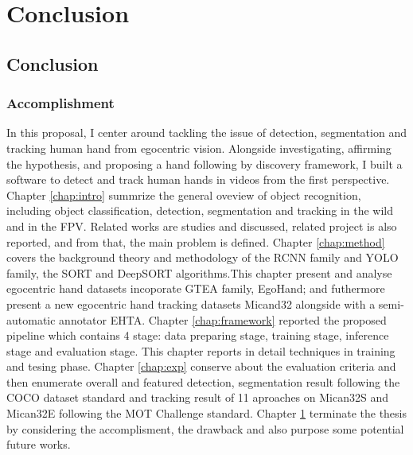 \chapter{Conclusion}\label{chap:conclusion}
\section{Conclusion}
\subsection{Accomplishment}
In this proposal, I center around tackling the issue of detection, segmentation and tracking human hand from egocentric vision. Alongside investigating, affirming the hypothesis, and proposing a hand following by discovery framework, I built a software to detect and track human hands in videos from the first perspective. Chapter \ref{chap:intro} summrize the general oveview of object recognition, including object classification, detection, segmentation and tracking in the wild and in the FPV. Related works are studies and discussed, related project is also reported, and from that, the main problem is defined. Chapter \ref{chap:method} covers the background theory and methodology of the RCNN family and YOLO family, the SORT and DeepSORT algorithms.This chapter present and analyse egocentric  hand datasets incoporate GTEA family, EgoHand; and futhermore present a new egocentric hand tracking datasets Micand32 alongside with a semi-automatic annotator EHTA. Chapter \ref{chap:framework} reported the proposed pipeline which contains 4 stage: data preparing stage, training stage, inference stage and evaluation stage. This chapter reports in detail techniques in training and tesing phase. Chapter \ref{chap:exp} conserve about the evaluation criteria and then enumerate overall and featured detection, segmentation result following the COCO dataset standard and tracking result of 11 aproaches on Mican32S and Mican32E following the MOT Challenge standard. Chapter \ref{chap:conclusion} terminate the thesis by considering the accomplisment, the drawback and also purpose some potential future works.
